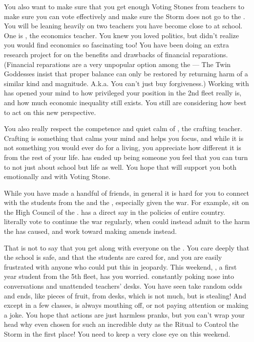 \documentclass[char]{GL2020}
\begin{document}
You also want to make sure that you get enough Voting Stones from teachers to make sure you can vote effectively and make sure the Storm does not go to the \pShip{}. You will be leaning heavily on two teachers you have become close to at school. One is \cChupSecond{\full}, the economics teacher. You knew you loved politics, but didn’t realize you would find economics so fascinating too! You have been doing an extra research project for \cChupSecond{\them} on the benefits and drawbacks of financial reparations. (Financial reparations are a very unpopular option among the \pShippies{} — The Twin Goddesses insist that proper balance can only be restored by returning harm of a similar kind and magnitude. A.k.a. You can’t just buy forgiveness.) Working with \cChupSecond{\them} has opened your mind to how privileged your position in the 2nd fleet really is, and how much economic inequality still exists. You still are considering how best to act on this new perspective. 

You also really respect the competence and quiet calm of \cPirate{\full}, the crafting teacher. Crafting is something that calms your mind and helps you focus, and while it is not something you would ever do for a living, you appreciate how different it is from the rest of your life. \cPirate{} has ended up being someone you feel that you can turn to not just about school but life as well. You hope that \cPirate{\they} will support you both emotionally and with \cPirate{\their} Voting Stone.  

While you have made a handful of friends, in general it is hard for you to connect with the students from the \pTech{} and the \pFarm{}, especially given the war. For example, \cTechStar{\full} sit\cTechStar{\verbs} on the High Council of the \pTech{}. \cTechStar{} has a direct say in the policies of \cTechStar{\their} entire country. \cTechStar{\They} literally vote to continue the war regularly, when \cTechStar{\they} could instead admit to the harm the \pTech{} has caused, and work toward making amends instead. 

That is not to say that you get along with everyone on the \pShip{}. You care deeply that the school is safe, and that the students are cared for, and you are easily frustrated with anyone who could put this in jeopardy. This weekend, \cPirateChild{\full}, a first year student from the 5th fleet, has you worried. \cPirateChild{\Theyare} constantly poking \cPirateChild{\their} nose into conversations and unattended teachers’ desks. You have seen \cPirateChild{\them} take random odds and ends, like pieces of fruit, from desks, which is not much, but is stealing! And except in a few classes, \cPirateChild{} is always mouthing off, or not paying attention or making a joke. You hope that \cPirateChild{\their} actions are just harmless pranks, but you can’t wrap your head why \cPirateChild{\theywere} even chosen for such an incredible duty as the Ritual to Control the Storm in the first place! You need to keep a very close eye on \cPirateChild{\them} this weekend.
\end{document}
